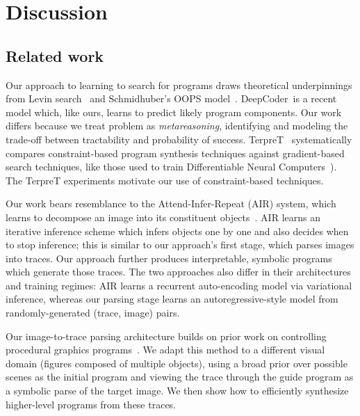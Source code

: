 \documentclass{article}
\begin{document}
\section{Discussion}

\subsection{Related work}


Our approach to learning to search for programs draws theoretical
underpinnings from Levin
search~\cite{levin1973universal,solomonoff1984optimum} and
Schmidhuber's OOPS model~\cite{schmidhuber2004optimal}.
DeepCoder~\cite{BalGauBroetal16}is a recent model which, like ours, learns to predict likely program components.
Our work differs because we treat
problem as \emph{metareasoning}, identifying and modeling
the trade-off between tractability and probability of success.
TerpreT~\cite{gaunt2016terpret} 
systematically compares constraint-based program synthesis techniques
against gradient-based search techniques, like those used to train
Differentiable Neural Computers~\cite{graves2016hybrid}).  The TerpreT
experiments motivate our use of constraint-based techniques.



Our work bears resemblance to the Attend-Infer-Repeat (AIR) system, which learns to decompose an image into its constituent objects~\cite{eslami1603attend}. AIR learns an iterative inference scheme which infers objects one by one and also decides when to stop inference; this is similar to our approach's first stage, which parses images into traces. Our approach further produces interpretable, symbolic programs which generate those traces. The two approaches also differ in their architectures and training regimes: AIR learns a recurrent auto-encoding model via variational inference, whereas our parsing stage learns an autoregressive-style model from randomly-generated (trace, image) pairs.

Our image-to-trace parsing architecture builds on prior work on controlling procedural graphics programs~\cite{ritchie2016neurally}.
We adapt this method to a different visual domain (figures composed of multiple objects), using a broad prior over possible scenes as the initial program and viewing the trace through the guide program as a symbolic parse of the target image.
We then show how to efficiently synthesize higher-level programs from these traces.
\end{document}

